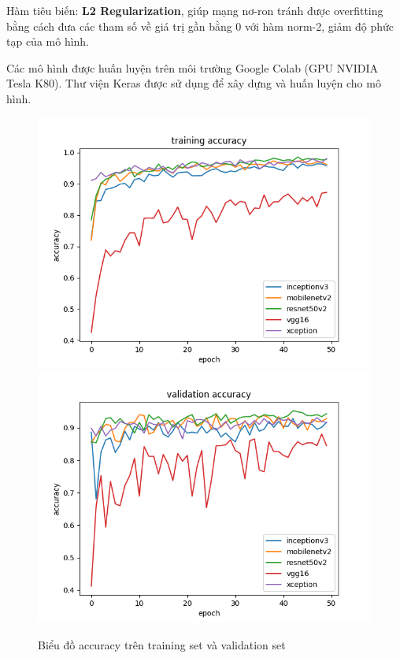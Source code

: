 \documentclass[a4paper,14pt]{extarticle}
\begin{document}
	Hàm tiêu biến: \textbf{L2 Regularization}, giúp mạng nơ-ron tránh được overfitting bằng cách đưa các tham số về giá trị gần bằng 0 với hàm norm-2, giảm độ phức tạp của mô hình.

	Các mô hình được huấn luyện trên môi trường Google Colab (GPU NVIDIA Tesla K80). Thư viện Keras được sử dụng để xây dựng và huấn luyện cho mô hình.

	\begin{figure}[H]
		\centering
		\includegraphics[scale=0.45]{images/accuracy.png}
		\includegraphics[scale=0.45]{images/val_accuracy.png}
		\caption{Biểu đồ accuracy trên training set và validation set}
	\end{figure}
\end{document}
